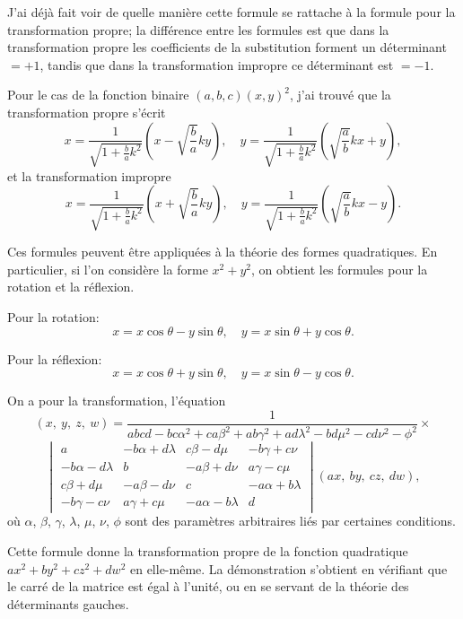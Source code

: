 \documentclass[11pt,a4paper]{book}
\begin{document}
\newpage
\setcounter{page}{212}

J'ai d\'{e}j\`{a} fait voir de quelle mani\`{e}re cette formule se rattache \`{a} la formule pour la transformation propre; la diff\'{e}rence entre les formules est que dans la transformation propre les coefficients de la substitution forment un d\'{e}terminant $= +1$, tandis que dans la transformation impropre ce d\'{e}terminant est $= -1$.

Pour le cas de la fonction binaire $(a, b, c)(x, y)^2$, j'ai trouv\'{e} que la transformation propre s'\'{e}crit
\[
x = \frac{1}{\sqrt{1 + \frac{b}{a}k^2}}(x - \sqrt{\frac{b}{a}}ky),\quad
y = \frac{1}{\sqrt{1 + \frac{b}{a}k^2}}(\sqrt{\frac{a}{b}}kx + y),
\]
et la transformation impropre
\[
x = \frac{1}{\sqrt{1 + \frac{b}{a}k^2}}(x + \sqrt{\frac{b}{a}}ky),\quad
y = \frac{1}{\sqrt{1 + \frac{b}{a}k^2}}(\sqrt{\frac{a}{b}}kx - y).
\]

Ces formules peuvent \^{e}tre appliqu\'{e}es \`{a} la th\'{e}orie des formes quadratiques. En particulier, si l'on consid\`{e}re la forme $x^2 + y^2$, on obtient les formules pour la rotation et la r\'{e}flexion.

Pour la rotation:
\[
x = x\cos\theta - y\sin\theta,\quad
y = x\sin\theta + y\cos\theta.
\]

Pour la r\'{e}flexion:
\[
x = x\cos\theta + y\sin\theta,\quad
y = x\sin\theta - y\cos\theta.
\]

\newpage
\setcounter{page}{213}

On a pour la transformation, l'\'{e}quation
\[
(x,\ y,\ z,\ w) =
\frac{1}{abcd - bc\alpha^2 + ca\beta^2 + ab\gamma^2 + ad\lambda^2 - bd\mu^2 - cd\nu^2 - \phi^2}
\times
\]
\[
\begin{vmatrix}
a & -b\alpha + d\lambda & c\beta - d\mu & -b\gamma + c\nu \\
-b\alpha - d\lambda & b & -a\beta + d\nu & a\gamma - c\mu \\
c\beta + d\mu & -a\beta - d\nu & c & -a\alpha + b\lambda \\
-b\gamma - c\nu & a\gamma + c\mu & -a\alpha - b\lambda & d
\end{vmatrix}
(ax,\ by,\ cz,\ dw),
\]
o\`{u} $\alpha$, $\beta$, $\gamma$, $\lambda$, $\mu$, $\nu$, $\phi$ sont des param\`{e}tres arbitraires li\'{e}s par certaines conditions.

\newpage
\setcounter{page}{214}

Cette formule donne la transformation propre de la fonction quadratique $ax^2 + by^2 + cz^2 + dw^2$ en elle-m\^{e}me. La d\'{e}monstration s'obtient en v\'{e}rifiant que le carr\'{e} de la matrice est \'{e}gal \`{a} l'unit\'{e}, ou en se servant de la th\'{e}orie des d\'{e}terminants gauches.
\end{document}
